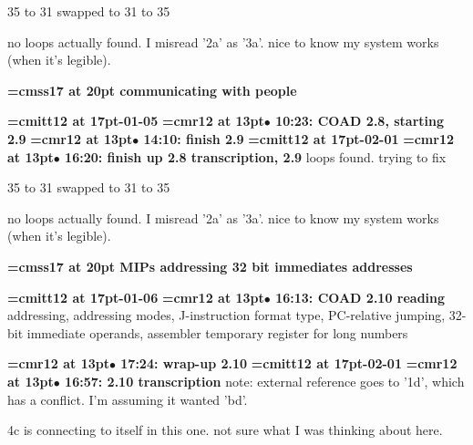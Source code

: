 35 to 31 swapped to 31 to 35
\par

no loops actually found. I misread '2a' as '3a'. nice to know my system works (when it's legible).
\par

{\medskip\noindent\bf\font\titlefont=cmss17 at 20pt communicating with people}\medskip

{\medskip\noindent\bf\font\titlefont=cmitt12 at 17pt-01-05}\medskip
{\smallskip\noindent\bf\font\titlefont=cmr12 at 13pt\titlefont $\bullet$ 10:23: COAD 2.8, starting 2.9}\smallskip
{\smallskip\noindent\bf\font\titlefont=cmr12 at 13pt\titlefont $\bullet$ 14:10: finish 2.9}\smallskip
{\medskip\noindent\bf\font\titlefont=cmitt12 at 17pt-02-01}\medskip
{\smallskip\noindent\bf\font\titlefont=cmr12 at 13pt\titlefont $\bullet$ 16:20: finish up 2.8 transcription, 2.9}\smallskip
loops found. trying to fix
\par

35 to 31 swapped to 31 to 35
\par

no loops actually found. I misread '2a' as '3a'. nice to know my system works (when it's legible).
\par

{\medskip\noindent\bf\font\titlefont=cmss17 at 20pt MIPs addressing 32 bit immediates addresses}\medskip

{\medskip\noindent\bf\font\titlefont=cmitt12 at 17pt-01-06}\medskip
{\smallskip\noindent\bf\font\titlefont=cmr12 at 13pt\titlefont $\bullet$ 16:13: COAD 2.10 reading}\smallskip
addressing, addressing modes, J-instruction format type, PC-relative jumping, 32-bit immediate operands, assembler temporary register for long numbers
\par

{\smallskip\noindent\bf\font\titlefont=cmr12 at 13pt\titlefont $\bullet$ 17:24: wrap-up 2.10}\smallskip
{\medskip\noindent\bf\font\titlefont=cmitt12 at 17pt-02-01}\medskip
{\smallskip\noindent\bf\font\titlefont=cmr12 at 13pt\titlefont $\bullet$ 16:57: 2.10 transcription}\smallskip
note: external reference goes to '1d', which has a conflict. I'm assuming it wanted 'bd'.
\par

4c is connecting to itself in this one. not sure what I was thinking about here.
\par

